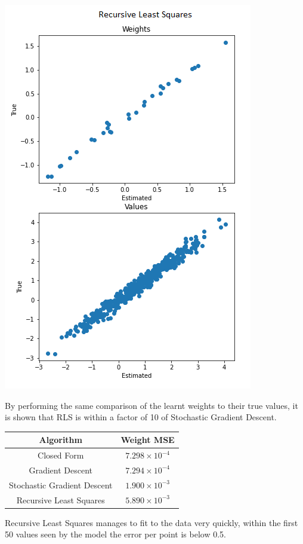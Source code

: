 \documentclass[sigconf]{acmart}
\begin{document}
\begin{center}
    \includegraphics[scale= 0.4]{figs/RLS Weights.png}
\end{center}

By performing the same comparison of the learnt weights to their true values, it is shown that RLS is within a factor of 10 of Stochastic Gradient Descent.
\begin{center}
    \begin{tabular}{| c c |}
        \hline
        Algorithm & Weight MSE \\ 
        \hline\hline
        Closed Form & $7.298 \times 10^{-4}$\\ 
        Gradient Descent & $7.294 \times 10^{-4}$ \\
        Stochastic Gradient Descent & $1.900 \times 10^{-3}$\\
        Recursive Least Squares & $5.890 \times 10^{-3}$\\
        \hline      
    \end{tabular}
\end{center}
Recursive Least Squares manages to fit to the data very quickly, within the first 50 values seen by the model the error per point is below 0.5.
\end{document}
